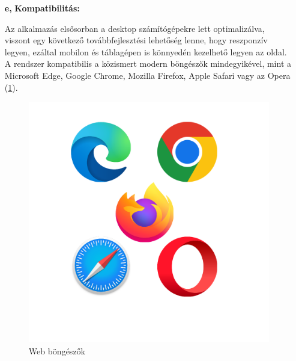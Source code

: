 \begin{itemize}
	\pagebreak
	\item[\textbf{e,}] \textbf{Kompatibilitás:}

Az alkalmazás elsősorban a desktop számítógépekre lett optimalizálva, viszont egy következő továbbfejlesztési lehetőség lenne, hogy reszponzív legyen, ezáltal mobilon és táblagépen is könnyedén kezelhető legyen az oldal. A rendszer kompatibilis a közismert modern böngészők mindegyikével, mint a Microsoft Edge, Google Chrome, Mozilla Firefox, Apple Safari vagy az Opera (\ref{abra:browserLogos}).

\begin{figure}[!h]
	\centering
	\includegraphics[scale=0.2]{images/browserLogos}
	\caption{Web böngészők}
	\label{abra:browserLogos}
\end{figure}
\end{itemize}